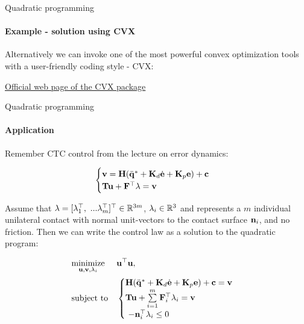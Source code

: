 \documentclass{beamer}
\begin{document}
\begin{frame}{Quadratic programming}
\framesubtitle{Example - solution using CVX}
\begin{flushleft}

Alternatively we can invoke one of the most powerful convex optimization tools with a user-friendly coding style - CVX:



\href{http://cvxr.com/cvx/}{Official web page of the CVX package}

\end{flushleft}
\end{frame}






\begin{frame}{Quadratic programming}
\framesubtitle{Application}
\begin{flushleft}

Remember CTC control from the lecture on error dynamics:

\begin{equation}
\begin{cases}
    \mathbf{v} = \mathbf{H}(\ddot{\mathbf{q}}^* + \mathbf{K}_d\dot{\mathbf{e}} + \mathbf{K}_p\mathbf{e}) + \mathbf{c} \\
    \mathbf{T}\mathbf{u} + \mathbf{F}^\top \lambda = \mathbf{v}
\end{cases}
\end{equation}

Assume that $\lambda = [\lambda_1^\top, \ ...  \lambda_m^\top]^\top \in \R^{3m}$, $\lambda_i \in \mathbb{R}^{3}$ and represents a $m$ individual unilateral contact with normal unit-vectors to the contact surface $\mathbf{n}_i$, and no friction. Then we can write the control law as a solution to the quadratic program:

\begin{equation}
\begin{aligned}
& \underset{\mathbf{u}, \mathbf{v}, \lambda_i}{\text{minimize}}
& & \mathbf{u}^\top \mathbf{u}, \\
& \text{subject to}
& & \begin{cases}
    \mathbf{H}(\ddot{\mathbf{q}}^* + \mathbf{K}_d\dot{\mathbf{e}} + \mathbf{K}_p\mathbf{e}) + \mathbf{c} = \mathbf{v} \\
    \mathbf{T}\mathbf{u} + \sum\limits_{i = 1}^m \mathbf{F}_i^\top \lambda_i = \mathbf{v} \\\
    -\mathbf{n}_i^\top \lambda_i \leq 0
\end{cases}
\end{aligned}
\end{equation}

\end{flushleft}
\end{frame}
\end{document}

